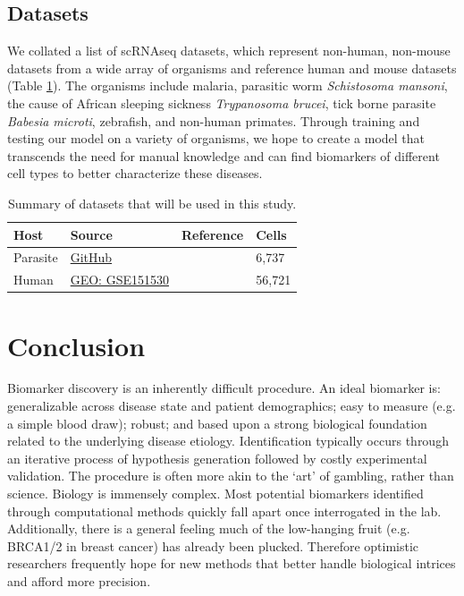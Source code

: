 \documentclass{article}
\begin{document}
\subsection{Datasets}

We collated a list of scRNAseq datasets, which represent non-human, non-mouse datasets from a wide array of organisms and reference human and mouse datasets (Table \ref{tab:dat_summary}). The organisms include malaria, parasitic worm \emph{Schistosoma mansoni}, the cause of African sleeping sickness \emph{Trypanosoma brucei}, tick borne parasite \emph{Babesia microti}, zebrafish, and non-human primates. Through training and testing our model on a variety of organisms, we hope to create a model that transcends the need for manual knowledge and can find biomarkers of different cell types to better characterize these diseases. 

\begin{table}[!h]
  \caption{Summary of datasets that will be used in this study.}
  \label{tab:dat_summary}
  \centering
  \begin{tabularx}{\textwidth}{lXll}
    \toprule
    \textbf{Host} & \textbf{Source} & \textbf{Reference} & \textbf{Cells} \\
    \midrule
    Parasite & \href{https://github.com/vhowick/MalariaCellAtlas/tree/4e19a713d0681b118cc7e229133489f039b8766b/Expression_Matrices/10X/pf10xIDC}{GitHub} & \citet{howickMalariaCellAtlas2019} & 6,737 \\
    \midrule
    Human & \href{https://www.ncbi.nlm.nih.gov/geo/query/acc.cgi?acc=GSE151530}{GEO: GSE151530} & \citet{maMultiregionalSinglecellDissection2022} & 56,721 \\
    \bottomrule
  \end{tabularx}
\end{table}

\section{Conclusion}

Biomarker discovery is an inherently difficult procedure. An ideal biomarker is: generalizable across disease state and patient demographics; easy to measure (e.g. a simple blood draw); robust; and based upon a strong biological foundation related to the underlying disease etiology. Identification typically occurs through an iterative process of hypothesis generation followed by costly experimental validation. The procedure is often more akin to the ‘art’ of gambling, rather than science. Biology is immensely complex. Most potential biomarkers identified through computational methods quickly fall apart once interrogated in the lab. Additionally, there is a general feeling much of the low-hanging fruit (e.g. BRCA1/2 in breast cancer) has already been plucked. Therefore optimistic researchers frequently hope for new methods that better handle biological intrices and afford more precision. 
\end{document}
